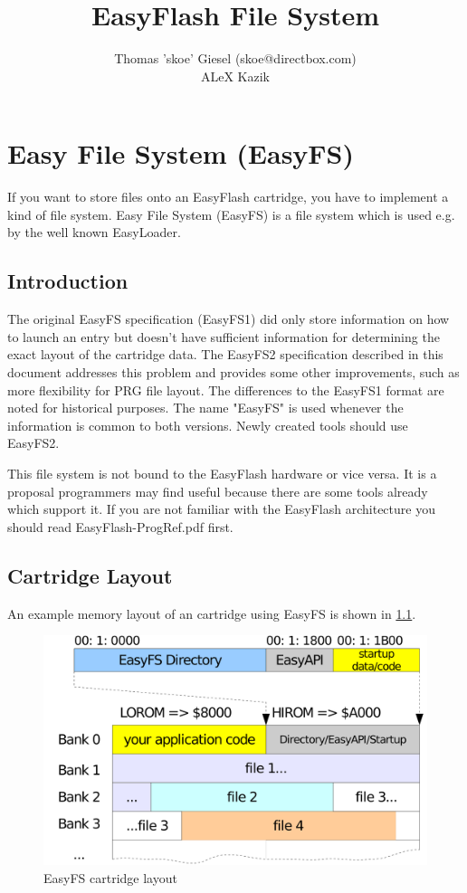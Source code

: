 \documentclass[a4paper,oneside]{memoir}
\title{EasyFlash File System}
\author{
Thomas 'skoe' Giesel (skoe@directbox.com) \\
ALeX Kazik
}
\begin{document}
\hsize
\maketitle

\tableofcontents

\chapter{Easy File System (EasyFS)}

If you want to store files onto an EasyFlash cartridge, you have to implement a
kind of file system. Easy File System (EasyFS) is a file system which is used
e.g. by the well known EasyLoader.

\section{Introduction}

The original EasyFS specification (EasyFS1) did only store information on how to
launch an entry but doesn't have sufficient information
for determining the exact layout of the cartridge data.
The EasyFS2 specification described in this document addresses this problem and
provides some other improvements, such as more flexibility for PRG file layout.
The differences to the EasyFS1 format are noted for historical purposes.
The name "EasyFS" is used whenever the information is common to both versions.
Newly created tools should use EasyFS2.

This file system is not bound to the EasyFlash hardware or vice versa. It is a
proposal programmers may find useful because there are some tools already which
support it. If you are not familiar with the EasyFlash architecture you should
read EasyFlash-ProgRef.pdf first.

\section{Cartridge Layout}

An example memory layout of an cartridge using EasyFS is shown in \ref{fig:easyfs}.

\begin{figure}[!htbp]
    \centering
    \includegraphics[scale=0.025]{src/easyfs.pdf}
    \caption{EasyFS cartridge layout}
    \label{fig:easyfs}
\end{figure}
\end{document}
